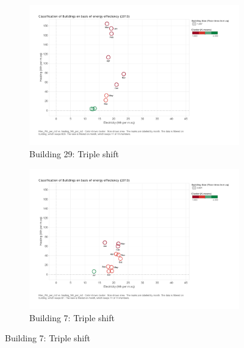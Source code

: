 \begin{figure}
        \centering
        \begin{subfigure}[b]{0.45\textwidth}
                \includegraphics[width=\textwidth]{images/kmeans_b29_3c.pdf}
                \caption{Building 29:  Triple shift}
                \label{fig:tri_1}
        \end{subfigure}%
        \begin{subfigure}[b]{0.45\textwidth}
                \includegraphics[width=\textwidth]{images/kmeans_b7.pdf}
                \caption{Building 7: Triple shift}
                \label{fig:tri_2}
        \end{subfigure}
        

\end{figure}
